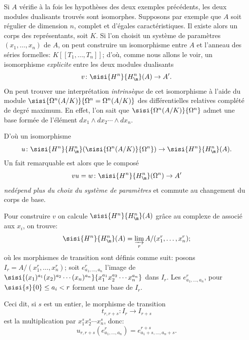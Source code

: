 \begin{remarque} \label{IV.5.5}
Si $A$ v\'erifie \`a la fois les hypoth\`eses des deux exemples pr\'ec\'edents, les deux modules dualisants trouv\'es sont isomorphes. Supposons par exemple que $A$ soit r\'egulier de dimension $n$, complet et d'\'egales caract\'eristiques. Il existe alors un corps des repr\'esentants, soit $K$. Si l'on choisit un syst\`eme de param\`etres $(x_{1}, \ldots, x_{n})$ de $A$, on peut construire un isomorphisme entre $A$ et l'anneau des s\'eries formelles: $K[[T_{1}, \ldots, T_{n}]]$; d'o\`u, comme nous allons le voir, un isomorphisme \emph{explicite} entre les deux modules dualisants
$$
v\colon \sisi{H^{n}}{{H^n_\m}}(A)\to A'.
$$
On peut trouver une interpr\'etation \emph{intrins\`eque} de cet isomorphisme \`a l'aide du module $\sisi{\Omega^{n}(A/K)}{\Omega^n=\Omega^{n}(A/K)}$ des diff\'erentielles relatives compl\'et\'e de degr\'e maximum. En effet, l'on sait que $\sisi{\Omega^{n}(A/K)}{\Omega^n}$ admet une base form\'ee de l'\'el\'ement $dx_{1}\wedge dx_{2}\cdots \wedge dx_{n}$.

D'o\`u un isomorphisme
$$
u\colon \sisi{H^{n}}{{H^n_\m}}(\sisi{\Omega^{n}(A/K)}{\Omega^n})\to \sisi{H^{n}}{{H^n_\m}}(A).
$$
Un fait remarquable est alors que le compos\'e
$$
vu=w\colon \sisi{H^{n}}{{H^n_\m}}(\Omega^{n})\to A'
$$
\emph{ne\pageoriginaled d\'epend plus du choix du syst\`eme de param\`etres} et commute au changement du corps de base.

Pour construire $v$ on calcule $\sisi{H^{n}}{{H^n_\m}}(A)$ gr\^ace au complexe de  associ\'e aux $x_{i}$, on trouve:
$$
\sisi{H^{n}}{{H^n_\m}}(A)=\varinjlim_{r}A/(x_{1}^{r}, \ldots, x_{n}^{r});
$$
o\`u les morphismes de transition sont d\'efinis comme suit: posons $I_{r}=A/(x_{1}^{r}, \ldots, x_{n}^{r})$; soit $e_{a_{1}, \ldots, a_{n}}^{r}$ l'image de $\sisi{(x_{1})^{a_{1}}(x_{2})^{a_{2}}\cdots (x_{n})^{a_{n}}}{x_{1}^{a_{1}}x_{2}^{a_{2}}\cdots x_{n}^{a_{n}}}$ dans $I_{r}$. Les $e_{a_{1}, \ldots, a_{n}}^{r}$, pour $\sisi{s}{0}\leq a_{i}<r$ forment une base de $I_{r}$.

Ceci dit, si $s$ est un entier, le morphisme de transition
$$
t_{r, r+s}\colon I_{r}\to I_{r+s}
$$
est la multiplication par $x_{1}^{s}x_{2}^{s}\cdots x_{n}^{s}$, donc:
$$
u_{r, r+s}(e_{a_{1}, \ldots, a_{n}}^{r})=e_{a_{1}+s, \ldots, a_{n}+s}^{r+s}.
$$


\end{remarque}
